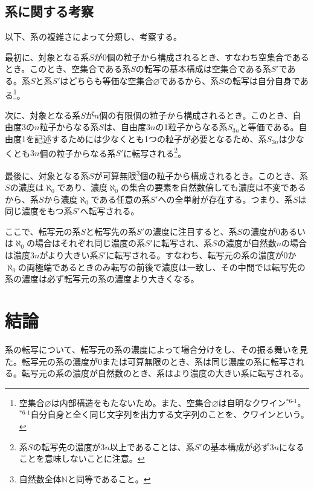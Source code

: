 \documentclass[10pt, a5paper, twoside]{jsarticle}
\theoremstyle{definition}
\begin{document}
		\subsection{系に関する考察}

			以下、系の複雑さによって分類し、考察する。


			最初に、対象となる系$S$が0個の粒子から構成されるとき、すなわち空集合であるとき。このとき、空集合である系$S$の転写の基本構成は空集合である系$S'$である。系$S$と系$S'$はどちらも等価な空集合$\varnothing$であるから、系$S$の転写は自分自身である\footnote{空集合$\varnothing$は内部構造をもたないため。また、空集合$\varnothing$は自明なクワイン$^{*6\text{-}1}$。\\$^{*6\text{-}1}$自分自身と全く同じ文字列を出力する文字列のことを、クワインという\cite{geb}。}。

			次に、対象となる系$S$が$n$個の有限個の粒子から構成されるとき。このとき、自由度3の$n$粒子からなる系$S$は、自由度$3n$の1粒子からなる系$S_{3n}$と等価である。自由度1を記述するためには少なくとも1つの粒子が必要となるため、系$S_{3n}$は少なくとも$3n$個の粒子からなる系$S'$に転写される\footnote{系$S$の転写先の濃度が$3n$以上であることは、系$S'$の基本構成が必ず$3n$になることを意味しないことに注意。}。

			最後に、対象となる系$S$が可算無限\footnote{自然数全体$\mathbb{N}$と同等であること。}個の粒子から構成されるとき。このとき、系$S$の濃度は$\aleph_0$であり、濃度$\aleph_0$の集合の要素を自然数倍しても濃度は不変であるから、系$S$から濃度$\aleph_0$である任意の系$S'$への全単射が存在する。つまり、系$S$は同じ濃度をもつ系$S'$へ転写される。

			ここで、転写元の系$S$と転写先の系$S'$の濃度に注目すると、系$S$の濃度が0あるいは$\aleph_0$の場合はそれぞれ同じ濃度の系$S'$に転写され、系$S$の濃度が自然数$n$の場合は濃度$3n$がより大きい系$S'$に転写される。すなわち、転写元の系の濃度が0か$\aleph_0$の両極端であるときのみ転写の前後で濃度は一致し、その中間では転写先の系の濃度は必ず転写元の系の濃度より大きくなる。

	\section{結論}

		系の転写について、転写元の系の濃度によって場合分けをし、その振る舞いを見た。転写元の系の濃度が0または可算無限のとき、系は同じ濃度の系に転写される。転写元の系の濃度が自然数のとき、系はより濃度の大きい系に転写される。
\end{document}
